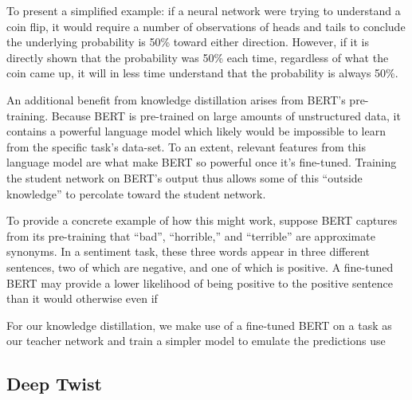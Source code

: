\documentclass[11pt]{article}
\begin{document}
To present a simplified example: if a neural network were trying to understand a
coin flip, it would require a number of observations of heads and tails to
conclude the underlying probability is 50\% toward either direction. However, if
it is directly shown that the probability was 50\% each time, regardless of what
the coin came up, it will in less time understand that the probability is always
50\%.

An additional benefit from knowledge distillation arises from BERT's
pre-training. Because BERT is pre-trained on large amounts of unstructured data,
it contains a powerful language model which likely would be impossible to learn
from the specific task's data-set. To an extent, relevant features from this
language model are what make BERT so powerful once it's fine-tuned. Training the
student network on BERT's output thus allows some of this ``outside knowledge''
to percolate toward the student network.

To provide a concrete example of how this might work, suppose BERT captures from
its pre-training that ``bad'', ``horrible,'' and ``terrible'' are approximate
synonyms. In a sentiment task, these three words appear in three different
sentences, two of which are negative, and one of which is positive. A fine-tuned
BERT may provide a lower likelihood of being positive to the positive sentence
than it would otherwise even if 



For our knowledge distillation, we make use of a fine-tuned BERT on a task as
our teacher network and train a simpler model to emulate the predictions use



\subsection{Deep Twist}



\begin{comment}
\begin{itemize}
\item How do you plan on training your parameters / inferring the
  states of your latent variables (MLE / MAP / Backprop / VI / EM / BP / ...)

\item What are the assumptions implicit in this technique? Is it an approximation or exact? If it is an approximation what bound does it optimize?

\item What is the explicit method / algorithm that you derive for learning these parameters?
\end{itemize}
\end{comment}
\end{document}
